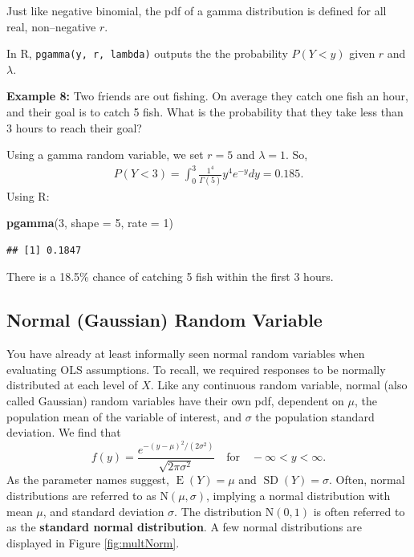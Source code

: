 \documentclass[
]{krantz}
\newenvironment{Shaded}{\begin{snugshade}}{\end{snugshade}}
\newcommand{\DataTypeTok}[1]{\textcolor[rgb]{0.27,0.27,0.27}{#1}}
\newcommand{\DecValTok}[1]{\textcolor[rgb]{0.06,0.06,0.06}{#1}}
\newcommand{\KeywordTok}[1]{\textcolor[rgb]{0.27,0.27,0.27}{\textbf{#1}}}
\newcommand{\NormalTok}[1]{#1}
\newcommand{\E}{\operatorname{E}}
\newcommand{\SD}{\operatorname{SD}}
\begin{document}
Just like negative binomial, the pdf of a gamma distribution is defined for all real, non--negative \(r\).

In R, \texttt{pgamma(y,\ r,\ lambda)} outputs the the probability \(P(Y < y)\) given \(r\) and \(\lambda\).

\textbf{Example 8:} Two friends are out fishing. On average they catch one fish an hour, and their goal is to catch 5 fish. What is the probability that they take less than 3 hours to reach their goal?

Using a gamma random variable, we set \(r = 5\) and \(\lambda = 1\). So,
\begin{align*}
P(Y < 3) = \int_0^3 \frac{1^4}{\Gamma(5)} y^{4} e^{-y}dy = 0.185.
\end{align*}
Using R:

\begin{Shaded}
\begin{Highlighting}[]
\KeywordTok{pgamma}\NormalTok{(}\DecValTok{3}\NormalTok{, }\DataTypeTok{shape =} \DecValTok{5}\NormalTok{, }\DataTypeTok{rate =} \DecValTok{1}\NormalTok{)}
\end{Highlighting}
\end{Shaded}

\begin{verbatim}
## [1] 0.1847
\end{verbatim}

There is a 18.5\% chance of catching 5 fish within the first 3 hours.

\hypertarget{normal-gaussian-random-variable}{%
\subsection{Normal (Gaussian) Random Variable}\label{normal-gaussian-random-variable}}

You have already at least informally seen normal random variables when evaluating OLS assumptions. To recall, we required responses to be normally distributed at each level of \(X\). Like any continuous random variable, normal (also called Gaussian) random variables have their own pdf, dependent on \(\mu\), the population mean of the variable of interest, and \(\sigma\) the population standard deviation. We find that
\begin{equation}
f(y) =  \frac{e^{-(y-\mu)^2/ (2 \sigma^2)}}{\sqrt{2\pi\sigma^2}} \quad \textrm{for} \quad -\infty < y < \infty.
\label{eq:normalRV}
\end{equation}
As the parameter names suggest, \(\E(Y) = \mu\) and \(\SD(Y) = \sigma\).
Often, normal distributions are referred to as \(\textrm{N}(\mu, \sigma)\), implying a normal distribution with mean \(\mu\), and standard deviation \(\sigma\). The distribution \(\textrm{N}(0,1)\) is often referred to as the \textbf{standard normal distribution}. A few normal distributions are displayed in Figure \ref{fig:multNorm}.
\end{document}
